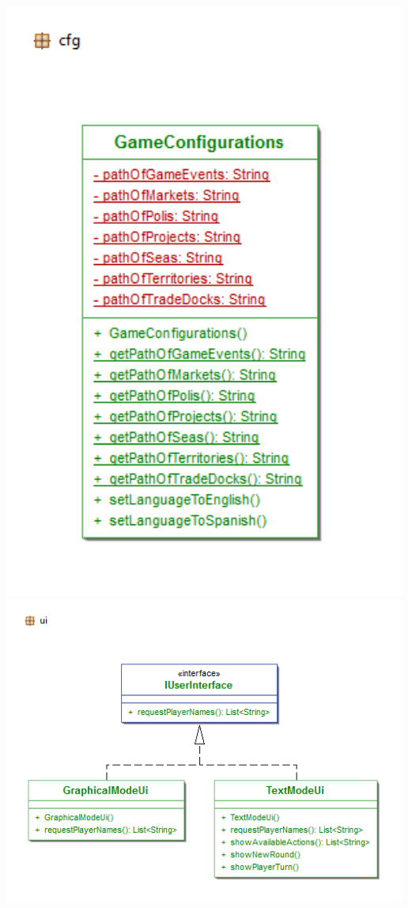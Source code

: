 \documentclass[11 pt]{book}
\begin{document}
\begin{center}
		    \includegraphics[width=500px]{design-uml/iteration3/package-cfg.png}
		    \includegraphics[width=500px]{design-uml/iteration3/package-ui.png}

\end{center}
\end{document}
